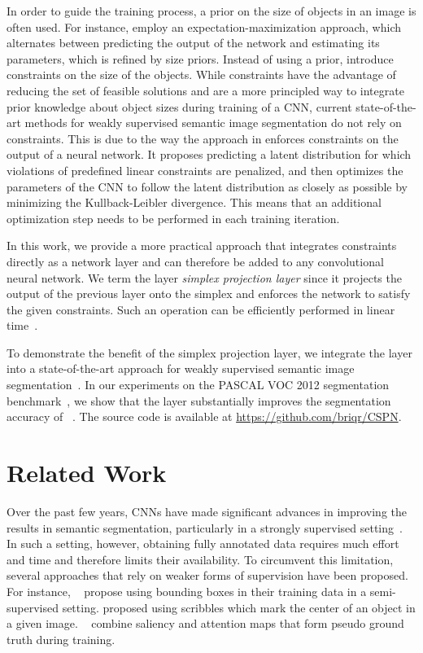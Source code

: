 \documentclass{bmvc2k}
\begin{document}
In order to guide the training process, a prior on the size of objects in an image is often used. For instance, \citet{chen2018deeplab} employ an expectation-maximization approach, which alternates between predicting the output of the network and estimating its parameters, which is refined by size priors. Instead of using a prior, \citet{pathak2015constrained} introduce constraints on the size of the objects. While constraints have the advantage of reducing the set of feasible solutions and are a more principled way to integrate prior knowledge about object sizes during training of a CNN, current state-of-the-art methods for weakly supervised semantic image segmentation do not rely on constraints. This is due to the way the approach in \cite{pathak2015constrained} enforces constraints on the output of a neural network. It proposes predicting a latent distribution for which violations of predefined linear constraints are penalized, and then optimizes the parameters of the CNN to follow the latent distribution as closely as possible by minimizing the Kullback-Leibler divergence. This means that an additional optimization step needs to be performed in each training iteration. 

In this work, we provide a more practical approach that integrates constraints directly as a network layer and can therefore be added to any convolutional neural network. We term the layer \emph{simplex projection layer} since it projects the output of the previous layer onto the simplex and enforces the network to satisfy the given constraints. Such an operation can be efficiently performed in linear time~\cite{duchi2008efficient}. 

To demonstrate the benefit of the simplex projection layer, we integrate the layer into a state-of-the-art approach for weakly supervised semantic image segmentation~\cite{kolesnikov2016seed}. In our experiments on the PASCAL VOC 2012 segmentation benchmark~\cite{everingham2015pascal}, we show that the layer substantially improves the segmentation accuracy of ~\cite{kolesnikov2016seed}. 
The source code is available at \url{https://github.com/briqr/CSPN}.	
	
	\section{Related Work}
	
Over the past few years, CNNs have made significant advances in improving the results in semantic segmentation, particularly in a strongly supervised setting~\citep{chen2018deeplab}. In such a setting, however, obtaining fully annotated data requires much effort and time and therefore limits their availability. To circumvent this limitation, several approaches that rely on weaker forms of supervision have been proposed. For instance, ~\citep{papandreou2015weakly} propose using bounding boxes in their training data in a semi-supervised setting. \citet{lin2016scribblesup} proposed using scribbles which mark the center of an object in a given image. ~\citet{chaudhry2017discovering} combine saliency and attention maps that form pseudo ground truth during training.
\end{document}
